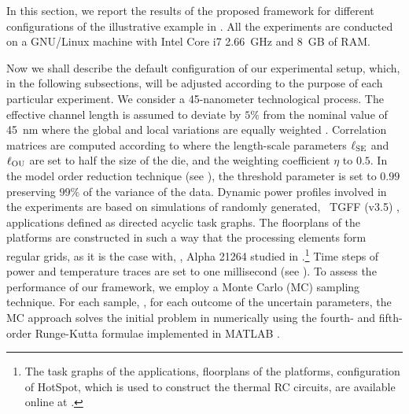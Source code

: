 In this section, we report the results of the proposed framework for different configurations of the illustrative example in .
All the experiments are conducted on a GNU/Linux machine with Intel Core i7 2.66~GHz and 8~GB of RAM.

Now we shall describe the default configuration of our experimental setup, which, in the following subsections, will be adjusted according to the purpose of each particular experiment.
We consider a 45-nanometer technological process.
The effective channel length is assumed to deviate by $5\%$ from the nominal value of 45~nm where the global and local variations are equally weighted \cite{juan2011, juan2012}.
Correlation matrices are computed according to  where the length-scale parameters $\ell_{\text{SE}}$ and $\ell_{\text{OU}}$ are set to half the size of the die, and the weighting coefficient $\eta$ to $0.5$.
In the model order reduction technique (see ), the threshold parameter is set to $0.99$ preserving $99\%$ of the variance of the data.
Dynamic power profiles involved in the experiments are based on simulations of randomly generated, \via\ TGFF (v3.5) \cite{dick1998}, applications defined as directed acyclic task graphs.
The floorplans of the platforms are constructed in such a way that the processing elements form regular grids, as it is the case with, \eg, Alpha 21264 studied in \cite{juan2011}.\footnote{The task graphs of the applications, floorplans of the platforms, configuration of HotSpot, which is used to construct the thermal RC circuits, are available online at \cite{sources}.}
Time steps of power and temperature traces are set to one millisecond (see ).
To assess the performance of our framework, we employ a Monte Carlo (MC) sampling technique.
For each sample, \ie, for each outcome of the uncertain parameters, the MC approach solves the initial problem in  numerically using the fourth- and fifth-order Runge-Kutta formulae \cite{press2007} implemented in MATLAB \cite{matlab}.

